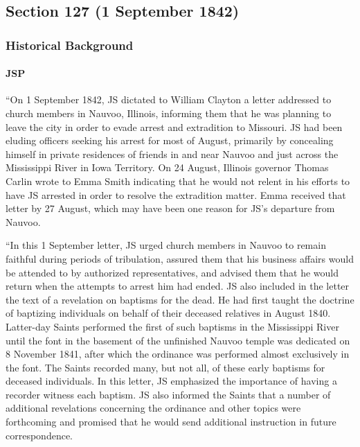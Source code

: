 \subsection{Section 127 (1 September 1842)}
	\label{DC127}

	\subsubsection{Historical Background}
		\label{DC127-HB}
		
		\paragraph{JSP}
		
			``On 1 September 1842, JS dictated to William Clayton a letter addressed to church members in Nauvoo, Illinois, informing them that he was planning to leave the city in order to evade arrest and extradition to Missouri. JS had been eluding officers seeking his arrest for most of August, primarily by concealing himself in private residences of friends in and near Nauvoo and just across the Mississippi River in Iowa Territory. On 24 August, Illinois governor Thomas Carlin wrote to Emma Smith indicating that he would not relent in his efforts to have JS arrested in order to resolve the extradition matter. Emma received that letter by 27 August, which may have been one reason for JS's departure from Nauvoo.

			``In this 1 September letter, JS urged church members in Nauvoo to remain faithful during periods of tribulation, assured them that his business affairs would be attended to by authorized representatives, and advised them that he would return when the attempts to arrest him had ended. JS also included in the letter the text of a revelation on baptisms for the dead. He had first taught the doctrine of baptizing individuals on behalf of their deceased relatives in August 1840. Latter-day Saints performed the first of such baptisms in the Mississippi River until the font in the basement of the unfinished Nauvoo temple was dedicated on 8 November 1841, after which the ordinance was performed almost exclusively in the font. The Saints recorded many, but not all, of these early baptisms for deceased individuals. In this letter, JS emphasized the importance of having a recorder witness each baptism. JS also informed the Saints that a number of additional revelations concerning the ordinance and other topics were forthcoming and promised that he would send additional instruction in future correspondence. 

